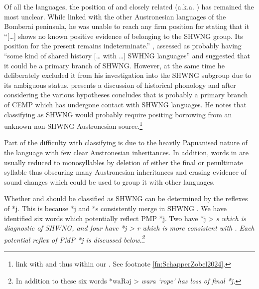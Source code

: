 \largerpage
{}
Of all the  languages,
the position of 
and closely related  (a.k.a.
) has remained the most unclear.
While \citet{Blust1993} linked  with the other Austronesian
languages of the Bomberai peninsula,
he was unable to reach any firm position for  stating
that it “[{\ldots}] shows no known positive evidence of belonging
to the SHWNG group.
Its position for the present remains indeterminate.” \citet[31]{Kamholz2014},
assessed  as probably having “some kind of shared history
[{\ldots} with {\ldots}] SWHNG languages”
and suggested that it could be a primary branch of SHWNG.
However, at the same time he deliberately excluded it from his
investigation into the SHWNG subgroup due to its ambiguous status.
\citet[242f]{Jackson2014} presents a discussion of  historical
phonology and after considering the various hypotheses concludes that 
is probably a primary branch of CEMP which has undergone contact with SHWNG languages.
He notes that classifying  as SHWNG would probably require
positing borrowing from an unknown non-SHWNG Austronesian source.\footnote{
		\citet{SchapperZobel2024b} link  with  and
		thus within our .
		See footnote \ref{fn:SchapperZobel2024}.}

Part of the difficulty with classifying  is due to the
heavily Papuanised nature of the language with few clear Austronesian inheritances.
In addition, words in  are usually reduced to monosyllables
by deletion of either the final or penultimate syllable thus
obscuring many Austronesian inheritances
and erasing evidence of sound changes which could be used to
group it with other languages.

Whether  and  should be classified as SHWNG can be
determined by the reflexes of *j.
This is because *j
and *s consistently merge in SHWNG \citep[52]{Kamholz2014}.
We have identified six words which potentially reflect PMP *j.
Two have *j > \it{s} which is diagnostic of SHWNG,
and four have *j > \it{r} which is more consistent with .
Each potential reflex of PMP *j is discussed below.\footnote{
		In addition to these six words *waRəj >  \it{wara} ‘rope’
		has loss of final *j.}

